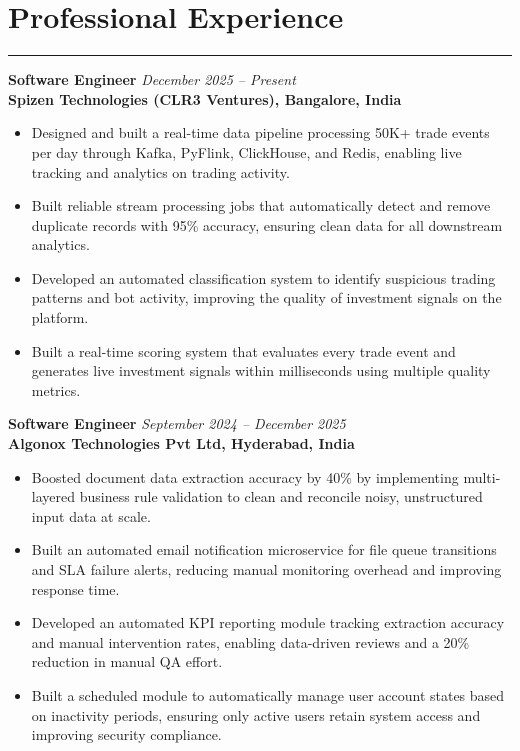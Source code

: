 \documentclass[10pt]{article}
\begin{document}
\section*{Professional Experience}
\vspace{1pt}\hrule\vspace{4pt}

\textbf{Software Engineer} \hfill \textit{December 2025 -- Present} \\
\textbf{Spizen Technologies (CLR3 Ventures), Bangalore, India}
\begin{itemize}
  \item Designed and built a real-time data pipeline processing 50K+ trade events per day through Kafka, PyFlink, ClickHouse, and Redis, enabling live tracking and analytics on trading activity.
  \item Built reliable stream processing jobs that automatically detect and remove duplicate records with 95\% accuracy, ensuring clean data for all downstream analytics.
  \item Developed an automated classification system to identify suspicious trading patterns and bot activity, improving the quality of investment signals on the platform.
  \item Built a real-time scoring system that evaluates every trade event and generates live investment signals within milliseconds using multiple quality metrics.
\end{itemize}

\textbf{Software Engineer} \hfill \textit{September 2024 -- December 2025} \\
\textbf{Algonox Technologies Pvt Ltd, Hyderabad, India}
\begin{itemize}
  \item Boosted document data extraction accuracy by 40\% by implementing multi-layered business rule validation to clean and reconcile noisy, unstructured input data at scale.
  \item Built an automated email notification microservice for file queue transitions and SLA failure alerts, reducing manual monitoring overhead and improving response time.
  \item Developed an automated KPI reporting module tracking extraction accuracy and manual intervention rates, enabling data-driven reviews and a 20\% reduction in manual QA effort.
  \item Built a scheduled module to automatically manage user account states based on inactivity periods, ensuring only active users retain system access and improving security compliance.
\end{itemize}
\end{document}
